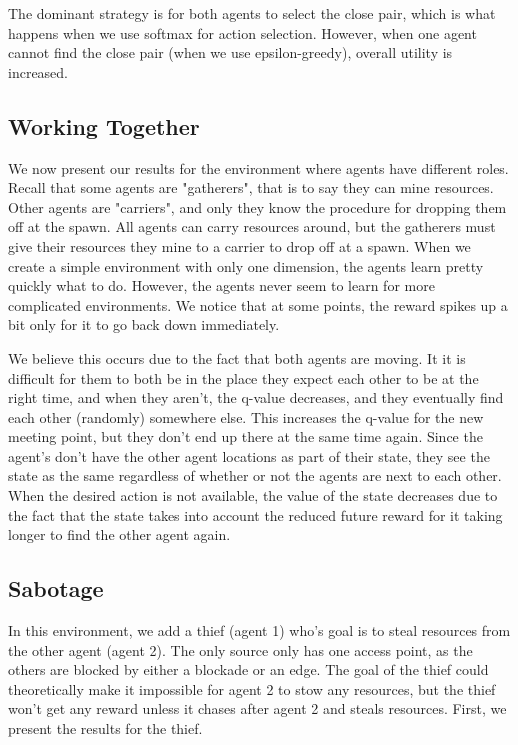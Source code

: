 \documentclass[11pt]{article}
\begin{document}
The dominant strategy is for both agents to select the close pair, which is what happens when we use softmax for action selection. However, when one agent cannot find the close pair (when we use epsilon-greedy), overall utility is increased.

\subsection{Working Together}

We now present our results for the environment where agents have different roles. Recall that some agents are "gatherers", that is to say they can mine resources. Other agents are "carriers", and only they know the procedure for dropping them off at the spawn. All agents can carry resources around, but the gatherers must give their resources they mine to a carrier to drop off at a spawn. When we create a simple environment with only one dimension, the agents learn pretty quickly what to do. However, the agents never seem to learn for more complicated environments. We notice that at some points, the reward spikes up a bit only for it to go back down immediately.

We believe this occurs due to the fact that both agents are moving. It it is difficult for them to both be in the place they expect each other to be at the right time, and when they aren't, the q-value decreases, and they eventually find each other (randomly) somewhere else. This increases the q-value for the new meeting point, but they don't end up there at the same time again. Since the agent's don't have the other agent locations as part of their state, they see the state as the same regardless of whether or not the agents are next to each other. When the desired action is not available, the value of the state decreases due to the fact that the state takes into account the reduced future reward for it taking longer to find the other agent again.\\

\subsection{Sabotage}

In this environment, we add a thief (agent 1) who's goal is to steal resources from the other agent (agent 2). The only source only has one access point, as the others are blocked by either a blockade or an edge. The goal of the thief could theoretically make it impossible for agent 2 to stow any resources, but the thief won't get any reward unless it chases after agent 2 and steals resources. First, we present the results for the thief.
\end{document}
